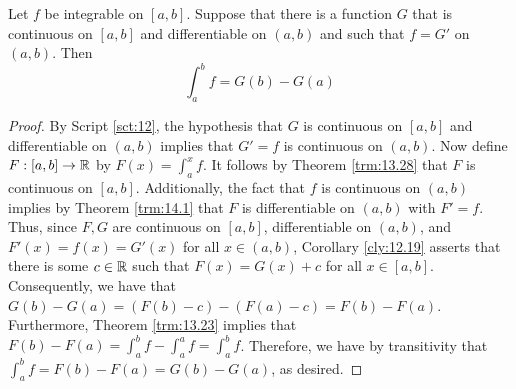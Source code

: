 \documentclass[../main.tex]{subfiles}
\begin{document}
\begin{theorem}\label{trm:14.4}
    Let $f$ be integrable on $[a,b]$. Suppose that there is a function $G$ that is continuous on $[a,b]$ and differentiable on $(a,b)$ and such that $f=G'$ on $(a,b)$. Then
    \begin{equation*}
        \int_a^bf = G(b)-G(a)
    \end{equation*}

    \begin{proof}
        By Script \ref{sct:12}, the hypothesis that $G$ is continuous on $[a,b]$ and differentiable on $(a,b)$ implies that $G'=f$ is continuous on $(a,b)$. Now define $F:[a,b]\to\mathbb{R}$ by $F(x)=\int_a^xf$. It follows by Theorem \ref{trm:13.28} that $F$ is continuous on $[a,b]$. Additionally, the fact that $f$ is continuous on $(a,b)$ implies by Theorem \ref{trm:14.1} that $F$ is differentiable on $(a,b)$ with $F'=f$. Thus, since $F,G$ are continuous on $[a,b]$, differentiable on $(a,b)$, and $F'(x)=f(x)=G'(x)$ for all $x\in(a,b)$, Corollary \ref{cly:12.19} asserts that there is some $c\in\mathbb{R}$ such that $F(x)=G(x)+c$ for all $x\in[a,b]$. Consequently, we have that $G(b)-G(a)=(F(b)-c)-(F(a)-c)=F(b)-F(a)$. Furthermore, Theorem \ref{trm:13.23} implies that $F(b)-F(a)=\int_a^bf-\int_a^af=\int_a^bf$. Therefore, we have by transitivity that $\int_a^bf=F(b)-F(a)=G(b)-G(a)$, as desired.
    \end{proof}
\end{theorem}
\end{document}
